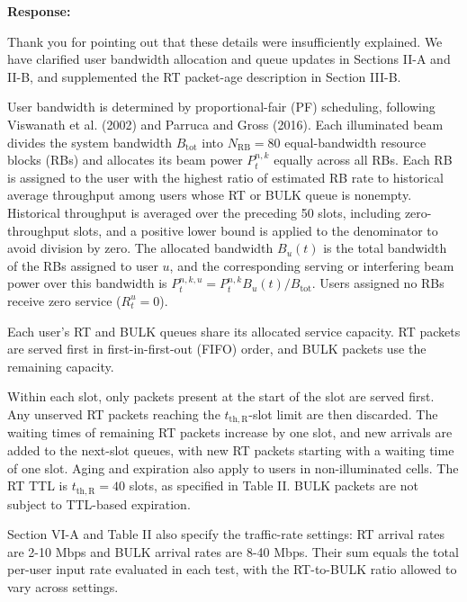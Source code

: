 \documentclass[11pt,a4paper]{article}
\newcommand{\qrev}[1]{{\color{qinrev}#1}}
\begin{document}
\textbf{Response:}\par

Thank you for pointing out that these details were insufficiently explained. We have clarified user bandwidth allocation and queue updates in Sections II-A and II-B, and supplemented the RT packet-age description in Section III-B.
\par

User bandwidth is determined by proportional-fair (PF) scheduling, following Viswanath et al. (2002) and Parruca and Gross (2016). Each illuminated beam divides \qrev{the system bandwidth $B_{\mathrm{tot}}$} into $N_{\mathrm{RB}}=80$ equal-bandwidth resource blocks \qrev{(RBs) and allocates its beam power $P_t^{n,k}$ equally across all RBs}. Each RB is assigned to the user with the highest ratio of estimated RB rate to historical average throughput among users whose RT or BULK queue is nonempty. Historical throughput is averaged over the preceding 50 slots, including zero-throughput slots, and a positive lower bound is applied to the denominator to avoid division by zero. \qrev{The allocated bandwidth $B_u(t)$ is the total bandwidth of the RBs assigned to user $u$, and the corresponding serving or interfering beam power over this bandwidth is $P_t^{n,k,u}=P_t^{n,k}B_u(t)/B_{\mathrm{tot}}$.} Users assigned no RBs receive zero service \qrev{($R_t^u=0$)}.
\par

Each user's RT and BULK queues share its allocated service capacity. RT packets are served first in first-in-first-out (FIFO) order, and BULK packets use the remaining capacity.
\par

Within each slot, \qrev{only} packets present at the start of the slot are served first. \qrev{Any unserved RT packets reaching the $t_{\mathrm{th},\mathrm{R}}$-slot limit} are then discarded. \qrev{The waiting times of remaining} RT packets increase by one slot, and new arrivals are added to the next-slot queues, with new RT packets \qrev{starting with a waiting time of one slot}. Aging and expiration also apply to users in non-illuminated cells. The RT TTL is $t_{\mathrm{th},\mathrm{R}}=40$ slots, as specified in Table II. BULK packets are not subject to TTL-based expiration.
\par

Section VI-A and Table II also specify the traffic-rate settings: RT arrival rates are 2-10 Mbps and BULK arrival rates are 8-40 Mbps. Their sum equals the total per-user input rate evaluated in each test, with the RT-to-BULK ratio allowed to vary across settings.
\par
\end{document}
